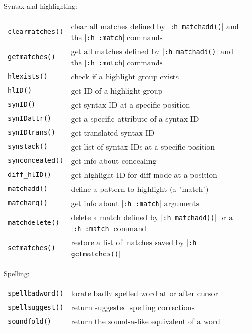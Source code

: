 Syntax and highlighting:
\label{syntax-functions}
\label{highlighting-functions}
\begin{center} \begin{tabular}{l l}
				\verb!clearmatches()! & clear all matches defined by |\verb!:h matchadd()!| and the |\verb!:h :match!| commands \\
				\verb!getmatches()! & get all matches defined by |\verb!:h matchadd()!| and the |\verb!:h :match!| commands \\
				\verb!hlexists()! & check if a highlight group exists \\
				\verb!hlID()! & get ID of a highlight group \\
				\verb!synID()! & get syntax ID at a specific position \\
				\verb!synIDattr()! & get a specific attribute of a syntax ID \\
				\verb!synIDtrans()! & get translated syntax ID \\
				\verb!synstack()! & get list of syntax IDs at a specific position \\
				\verb!synconcealed()! & get info about concealing \\
				\verb!diff_hlID()! & get highlight ID for diff mode at a position \\
				\verb!matchadd()! & define a pattern to highlight (a "match") \\
				\verb!matcharg()! & get info about |\verb!:h :match!| arguments \\
				\verb!matchdelete()! & delete a match defined by |\verb!:h matchadd()!| or a |\verb!:h :match!| command \\
				\verb!setmatches()! & restore a list of matches saved by |\verb!:h getmatches()!| \\
\end{tabular} \end{center}

Spelling:
\label{spell-functions}
\begin{center} \begin{tabular}{l l}
				\verb!spellbadword()! & locate badly spelled word at or after cursor \\
				\verb!spellsuggest()! & return suggested spelling corrections \\
				\verb!soundfold()! & return the sound-a-like equivalent of a word \\
\end{tabular} \end{center}

